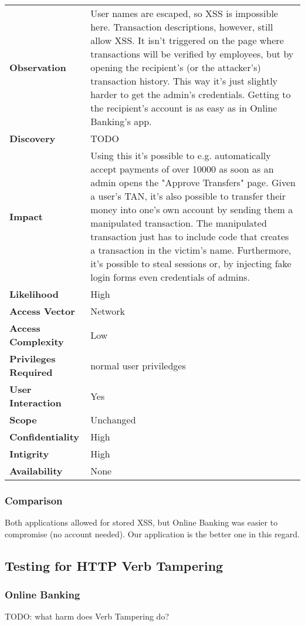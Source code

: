 \begin{tabular}{l|p{10cm}}
\textbf{Observation} & User names are escaped, so XSS is impossible here. Transaction descriptions, however, still allow XSS. It isn't triggered on the page where transactions will be verified by employees, but by opening the recipient's (or the attacker's) transaction history. This way it's just slightly harder to get the admin's credentials. Getting to the recipient's account is as easy as in Online Banking's app. \\
\textbf{Discovery} & TODO \\
\textbf{Impact} & Using this it's possible to e.g. automatically accept payments of over 10000 as soon as an admin opens the "Approve Transfers" page. Given a user's TAN, it's also possible to transfer their money into one's own account by sending them a manipulated transaction. The manipulated transaction just has to include code that creates a transaction in the victim's name. Furthermore, it's possible to steal sessions or, by injecting fake login forms even credentials of admins. \\
\textbf{Likelihood} & High \\
\textbf{Access Vector} & Network \\
\textbf{Access Complexity} & Low\\
\textbf{Privileges Required} & normal user priviledges \\
\textbf{User Interaction} & Yes\\
\textbf{Scope} & Unchanged \\
\textbf{Confidentiality} & High\\
\textbf{Intigrity} & High \\
\textbf{Availability} & None\\
\end{tabular}

\subsubsection*{Comparison}
Both applications allowed for stored XSS, but Online Banking was easier to compromise (no account needed).
Our application is the better one in this regard.

\clearpage


\subsection{Testing for HTTP Verb Tampering}

\subsubsection*{Online Banking}
TODO: what harm does Verb Tampering do?

